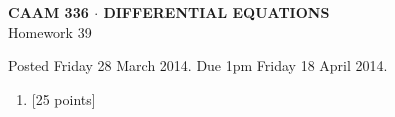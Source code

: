 \documentclass[10pt]{article}
\begin{document}
\vspace*{-5em}
\begin{center}
\large \textsf{\textbf{CAAM 336 $\cdot$ DIFFERENTIAL EQUATIONS}\\[0.5em]
Homework 39 }
\end{center}

Posted Friday 28 March 2014.  Due 1pm Friday 18 April 2014.

\begin{enumerate}\addtocounter{enumi}{38}
\item {[25 points]}  
\end{enumerate}
\end{document}
